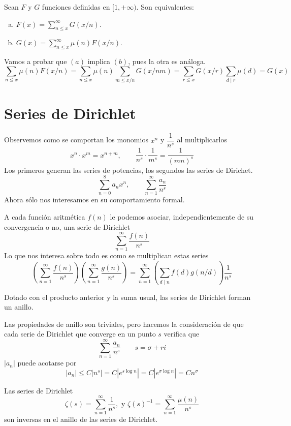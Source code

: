 \documentclass[TAN.tex]{subfiles}
\begin{document}
\begin{prop}
Sean $F$ y $G$ funciones definidas en $[1,+∞)$. Son equivalentes:
\begin{enumerate}[(a)]
\item $F(x) = \sum_{n\leq x}^{∞} G(x/n)$.
\item $G(x) = \sum_{n\leq x}^{∞} μ(n) F(x/n)$.
\end{enumerate}
\begin{dem}
Vamos a probar que $(a)$ implica $(b)$, pues la otra es análoga.
$$
\sum_{n\leq x} μ(n) F(x/n) = \sum_{n\leq x} μ(n) \sum_{m\leq x/n} G(x/nm) = \sum_{r\leq x} G(x/r) \sum_{d\mid r} \mu(d) = G(x)
$$
\end{dem}
\end{prop}
\section{Series de Dirichlet}

Observemos como se comportan los monomios $x^n$ y $\dfrac{1}{n^s}$ al multiplicarlos
\[ x^n \cdot x^m = x^{n+m}, \qquad \frac{1}{n^s} \cdot \frac{1}{m^s} = \frac{1}{(mn)^s} \]
Los primeros generan las series de potencias, los segundos las series de Dirichet.
\[ \sum_{n=0}^{8} a_n x^n, \qquad \sum_{n=1}^{∞} \frac{a_n}{n^s} \]
Ahora sólo nos interesamos en su comportamiento formal.

A cada función aritmética $f(n)$ le podemos asociar, independientemente de su convergencia o no, una serie de Dirichlet
\[ \sum_{n=1}^{∞} \frac{f(n)}{n^s} \]
Lo que nos interesa sobre todo es como se multiplican estas series
\[ \left(\sum_{n=1}^{∞} \frac{f(n)}{n^s}\right)\left(\sum_{n=1}^{∞} \frac{g(n)}{n^s}\right) = \sum_{n=1}^{∞}\left(\sum_{d\mid n} f(d) g(n/d)\right) \frac{1}{n^s}\]

\begin{prop}
Dotado con el producto anterior y la suma usual, las series de Dirichlet forman un anillo.
\end{prop}
\begin{dem}
Las propiedades de anillo son triviales, pero hacemos la consideración de que cada serie de Dirichlet que converge en un punto $s$ verifica que
$$\sum_{n=1}^{∞} \frac{a_n}{n^s} \qquad s = \sigma + ri
$$
$|a_n|$ puede acotarse por
$$
|a_n| \leq C|n^s|=C|e^{s\log n}|= C|e^{\sigma \log n}| = Cn^\sigma
$$
\end{dem}
\begin{prop}
Las series de Dirichlet
\[ ζ(s) = \sum_{n=1}^{∞} \frac{1}{n^s}, \text{ y } ζ(s)^{-1}=\sum_{n=1}^{∞} \frac{μ(n)}{n^s} \]
son inversas en el anillo de las series de Dirichlet.
\end{prop}
\end{document}
